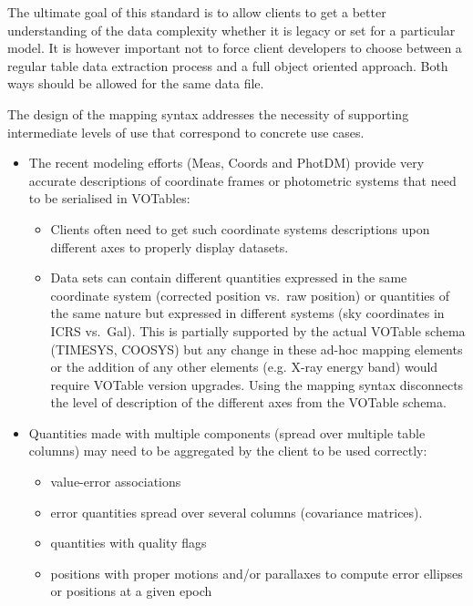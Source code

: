 
The ultimate goal of this standard is to allow clients to get a better understanding of the data complexity whether it is legacy or set for a particular model. It is however important not to force client developers  to choose between a regular table data extraction process and a full object oriented approach. Both ways should be allowed for the same data file.

The design of the mapping syntax addresses the necessity of supporting intermediate levels of use that correspond to concrete use cases.

\begin{itemize}
  \item The recent modeling efforts (Meas, Coords and PhotDM) provide very accurate descriptions of coordinate frames or photometric 
        systems that need to be serialised in VOTables:
  \begin{itemize}
    \item Clients often need to get such coordinate systems descriptions upon different axes to properly display datasets. 
    \item Data sets can contain different quantities expressed in the
    same coordinate system (corrected position vs.~raw position) or 
          quantities of the same nature but expressed in different
          systems (sky coordinates in ICRS vs.~Gal). 
          This is partially supported by the actual VOTable schema (TIMESYS, COOSYS) but any change in these ad-hoc mapping 
          elements or the addition of any other elements (e.g. X-ray energy band) would require VOTable version upgrades. 
          Using the mapping syntax disconnects the level of description of the different axes from the VOTable schema.           
  \end{itemize} 
  
  \item Quantities made with multiple components (spread over multiple table columns) may need to be aggregated by the client to be used correctly:
  \begin{itemize}
    \item value-error associations
    \item error quantities spread over several columns (covariance matrices). 
    \item quantities with quality flags
    \item positions with proper motions and/or parallaxes to compute error ellipses or positions at a given epoch
  \end{itemize} 


\end{itemize}
